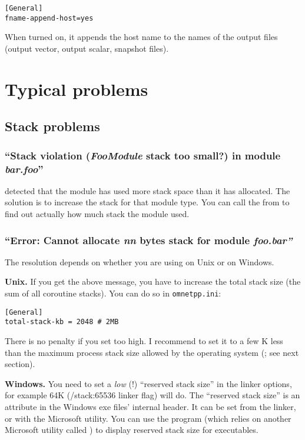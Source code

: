 \begin{verbatim}
[General]
fname-append-host=yes
\end{verbatim}

When turned on, it appends the host name to the names of the output
files (output vector, output scalar, snapshot files).



\section{Typical problems}

\subsection{Stack problems}

\subsubsection{``Stack violation (\textit{FooModule} stack too small?) in module \textit{bar.foo}''}

{\opp} detected that the module has used more stack space than it has
allocated. The solution is to increase the stack for that module type.
You can call the  from  to find out
actually how much stack the module used.


\subsubsection{``Error: Cannot allocate \textit{nn} bytes stack for module \textit{foo.bar''}}

The resolution depends on whether you are using {\opp} on Unix or on Windows.

\textbf{Unix.}
If you get the above message, you have to increase the total stack
size (the sum of all coroutine stacks). You can do
so in \texttt{omnetpp.ini}:

\begin{verbatim}
[General]
total-stack-kb = 2048 # 2MB
\end{verbatim}

There is no penalty if you set  too high. I
recommend to set it to a few K less than the maximum process stack
size allowed by the operating system (; see
next section).


\textbf{Windows.}
You need to set a \textit{low} (!) ``reserved stack size''
in the linker options, for example 64K (/stack:65536 linker flag) will do.
The ``reserved stack size'' is an attribute in the Windows exe
files' internal header. It can be set from the linker, or with
the  Microsoft utility. You can use the 
program (which relies on another Microsoft utility called )
to display reserved stack size for executables.

